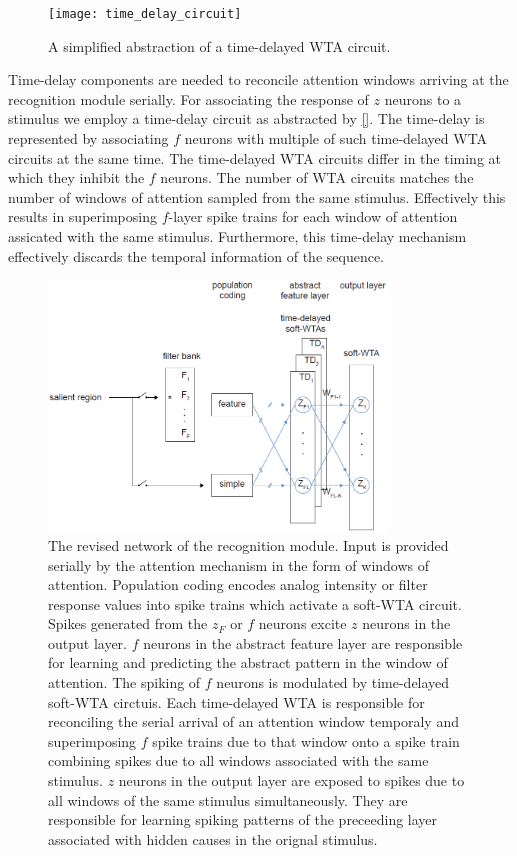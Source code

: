 \documentclass{report}
\begin{document}
\begin{figure}[ht]
\centering
\texttt{[image: time\_delay\_circuit]}
\caption{A simplified abstraction of a time-delayed WTA circuit.
\label{fig:time_delay_circuit}}
\end{figure}

Time-delay components are needed to reconcile attention windows arriving at the recognition module serially. For associating the response of $z$ neurons to a stimulus we employ a time-delay circuit as abstracted by \cref{}. The time-delay is represented by associating $f$ neurons with multiple of such time-delayed WTA circuits at the same time. The time-delayed WTA circuits differ in the timing at which they inhibit the $f$ neurons. The number of WTA circuits matches the number of windows of attention sampled from the same stimulus. Effectively this results in superimposing $f$-layer spike trains for each window of attention assicated with the same stimulus. Furthermore, this time-delay mechanism effectively discards the temporal information of the sequence.\\

\begin{figure}[ht]
\centering
\includegraphics[width=0.8\textwidth]{network}
\caption{The revised network of the recognition module. Input is provided serially by the attention mechanism in the form of windows of attention. Population coding encodes analog intensity or filter response values into spike trains which activate a soft-WTA circuit. Spikes generated from the $z_F$ or $f$ neurons excite $z$ neurons in the output layer. $f$ neurons in the abstract feature layer are responsible for learning and predicting the abstract pattern in the window of attention. The spiking of $f$ neurons is modulated by time-delayed soft-WTA circtuis. Each time-delayed WTA is responsible for reconciling the serial arrival of an attention window temporaly and superimposing $f$ spike trains due to that window onto a spike train combining spikes due to all windows associated with the same stimulus. $z$ neurons in the output layer are exposed to spikes due to all windows of the same stimulus simultaneously. They are responsible for learning spiking patterns of the preceeding layer associated with hidden causes in the orignal stimulus.
\label{fig:network}}
\end{figure}
\end{document}
